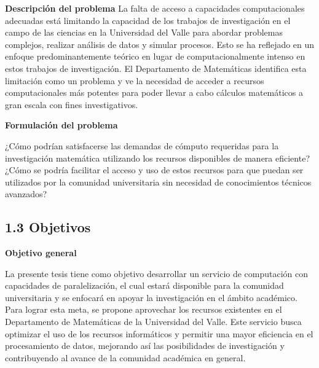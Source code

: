\begin{doublespace}
\begin{multicols}{2}
    \textbf{Descripción del problema}
    \vspace{3mm}
    La falta de acceso a capacidades computacionales adecuadas está limitando la capacidad de los trabajos de investigación en el campo de las ciencias en la Universidad del Valle para abordar problemas complejos, realizar análisis de datos y simular procesos. Esto se ha reflejado en un enfoque predominantemente teórico en lugar de computacionalmente intenso en estos trabajos de investigación. El Departamento de Matemáticas identifica esta limitación como un problema y ve la necesidad de acceder a recursos computacionales más potentes para poder llevar a cabo cálculos matemáticos a gran escala con fines investigativos.

    \textbf{Formulación del problema}
    \vspace{3mm}

    ¿Cómo podrían satisfacerse las demandas de cómputo requeridas para la investigación matemática utilizando los recursos disponibles de manera eficiente? ¿Cómo se podría facilitar el acceso y uso de estos recursos para que puedan ser utilizados por la comunidad universitaria sin necesidad de conocimientos técnicos avanzados?
    \vspace{1mm}

    \subsection{1.3 Objetivos}

    \textbf{Objetivo general}

    La presente tesis tiene como objetivo desarrollar un servicio de computación con capacidades de paralelización, el cual estará disponible para la comunidad universitaria y se enfocará en apoyar la investigación en el ámbito académico. Para lograr esta meta, se propone aprovechar los recursos existentes en el Departamento de Matemáticas de la Universidad del Valle. Este servicio busca optimizar el uso de los recursos informáticos y permitir una mayor eficiencia en el procesamiento de datos, mejorando así las posibilidades de investigación y contribuyendo al avance de la comunidad académica en general.
    \vspace{3mm}


\end{multicols}
\end{doublespace}
